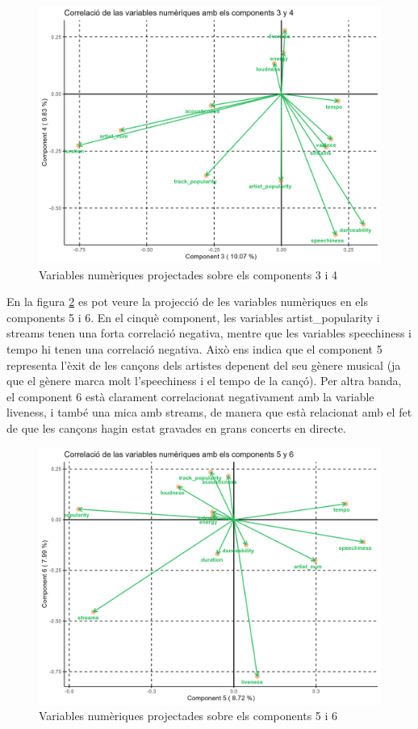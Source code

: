 \begin{figure}[H]
    \centering
    \includegraphics[width=0.8\linewidth]{Images/6_Factorial_Methods/ACP/Num_C3_C4.png}
    \caption{Variables numèriques projectades sobre els components 3 i 4}
    \label{fig:6_FM:ACP_C34}
\end{figure}

En la figura \ref{fig:6_FM:ACP_C56} es pot veure la projecció de les variables numèriques en els components 5 i 6. En el cinquè component, les variables artist\_popularity i streams tenen una forta correlació negativa, mentre que les variables speechiness i tempo hi tenen una correlació negativa. Això ens indica que el component 5 representa l'èxit de les cançons dels artistes depenent del seu gènere musical (ja que el gènere marca molt l'speechiness i el tempo de la cançó). Per altra banda, el component 6 està clarament correlacionat negativament amb la variable liveness, i també una mica amb streams, de manera que està relacionat amb el fet de que les cançons hagin estat gravades en grans concerts en directe.

\begin{figure}[H]
    \centering
    \includegraphics[width=0.8\linewidth]{Images/6_Factorial_Methods/ACP/Num_C5_C6.png}
    \caption{Variables numèriques projectades sobre els components 5 i 6}
    \label{fig:6_FM:ACP_C56}
\end{figure}

